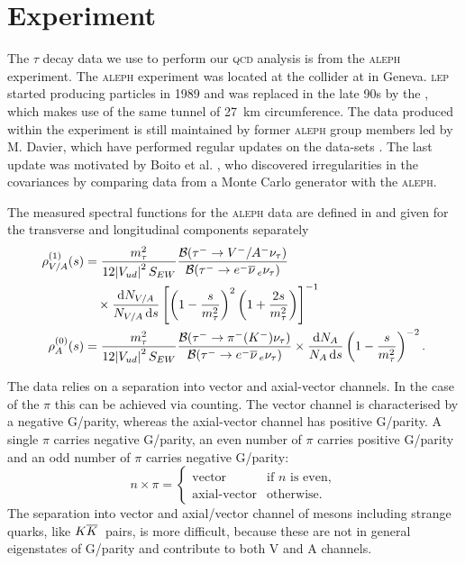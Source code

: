 \documentclass[../../index.tex]{subfiles}
\begin{document}
\section{Experiment}
The \(\tau\) decay data we use to perform our \textsc{qcd} analysis is from the
\textsc{aleph} experiment. The \textsc{aleph} experiment was located at the
 collider at  in Geneva. \textsc{lep} started producing
particles in 1989 and was replaced in the late 90s by the
, which makes use of the same tunnel of
\SI{27}{\kilo\meter} circumference. The data produced within the experiment is
still maintained by former \textsc{aleph} group members led by M. Davier, which
have performed regular updates on the data-sets
\cite{Davier2013,Davier2008,Aleph2005}. The last update was motivated by Boito
et al. \cite{Boito2010}, who discovered irregularities in the covariances by
comparing data from a Monte Carlo generator with the \textsc{aleph}.

The measured spectral functions for the \textsc{aleph} data are defined in
\cite{Davier2007} and given for the transverse and longitudinal components
separately
\begin{equation}
  \begin{split}
    \rho^{(1)}_{V/A}(s) &= \frac{m_\tau^2}{12 \abs{V_{ud}}^2S_{EW}} \frac{\mathcal{B}(\tau^- \to V^-/A^- \nu_\tau)}{\mathcal{B}(\tau^- \to e^- \anti{\nu}_e \nu_\tau)} \\
    &\quad\times \frac{\dif N_{V/A}}{N_{V/A}\dif s} \left[ \left( 1 - \frac{s}{m_\tau^2} \right)^2 \left( 1 + \frac{2s}{m_\tau^2} \right) \right]^{-1} \\
    \rho^{(0)}_{A}(s) &= \frac{m_\tau^2}{12 \abs{V_{ud}}^2 S_{EW}}
    \frac{\mathcal{B}(\tau^- \to \pi^-(K^-) \nu_\tau)}{\mathcal{B}(\tau^- \to
      e^- \anti{\nu}_e \nu_\tau)} \times \frac{\dif N_A}{N_A \dif s} \left( 1 -
      \frac{s}{m_\tau^2} \right)^{-2}.
  \end{split}
\end{equation}

The data relies on a separation into vector and axial-vector channels. In the
case of the \(\pi\) this can be achieved via counting. The vector channel is
characterised by a negative G\-/parity, whereas the axial-vector channel has
positive G\-/parity. A single \(\pi\) carries negative G\-/parity, an even
number of \(\pi\) carries positive G\-/parity and an odd number of \(\pi\)
carries negative G\-/parity:
\begin{equation}
  n \times \pi = \begin{cases} \mbox{vector} & \mbox{if } n \text{ is even}, \\ \mbox{axial-vector} & \mbox{otherwise.} \end{cases}
\end{equation}
The separation into vector and axial\-/vector channel of mesons including
strange quarks, like \(K\overline{K}\,\) pairs, is more difficult, because these are
not in general eigenstates of G\-/parity and contribute to both \textsc{V} and
\textsc{A} channels.
\end{document}
